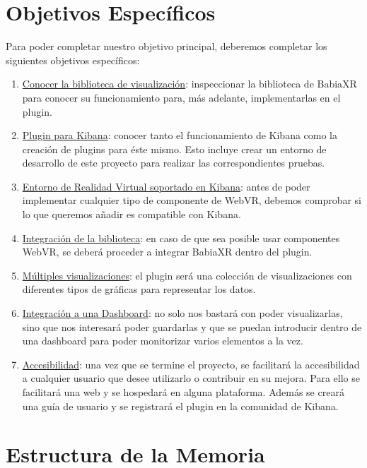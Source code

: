 \documentclass[a4paper, 12pt]{book}
\begin{document}
\section{Objetivos Específicos}
\label{sec:objetivosespecificos}

Para poder completar nuestro objetivo principal, deberemos completar los siguientes objetivos específicos:

\begin{enumerate}
    \item \underline{Conocer la biblioteca de visualización}: inspeccionar la biblioteca de BabiaXR para conocer su funcionamiento para, más adelante, implementarlas en el plugin.
    \item \underline{Plugin para Kibana}: conocer tanto el funcionamiento de Kibana como la creación de plugins para éste mismo. Esto incluye crear un entorno de desarrollo de este proyecto para realizar las correspondientes pruebas.
    \item \underline{Entorno de Realidad Virtual soportado en Kibana}: antes de poder implementar cualquier tipo de componente de WebVR, debemos comprobar si lo que queremos añadir es compatible con Kibana.
    \item \underline{Integración de la biblioteca}: en caso de que sea posible usar componentes WebVR, se deberá proceder a integrar BabiaXR dentro del plugin.
    \item \underline{Múltiples visualizaciones}: el plugin será una colección de visualizaciones con diferentes tipos de gráficas para representar los datos.
    \item \underline{Integración a una Dashboard}: no solo nos bastará con poder visualizarlas, sino que nos interesará poder guardarlas y que se puedan introducir dentro de una dashboard para poder monitorizar varios elementos a la vez.
    \item \underline{Accesibilidad}: una vez que se termine el proyecto, se facilitará la accesibilidad a cualquier usuario que desee utilizarlo o contribuir en su mejora. Para ello se facilitará una web y se hospedará en alguna plataforma. Además se creará una guía de usuario y se registrará el plugin en la comunidad de Kibana.
\end{enumerate}


\section{Estructura de la Memoria}
\label{sec:estructuramemoria}
\end{document}
